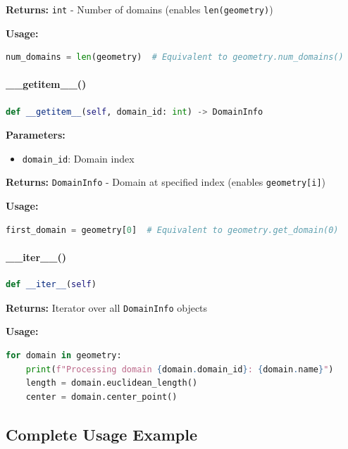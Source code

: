 \textbf{Returns:} \texttt{int} - Number of domains (enables \texttt{len(geometry)})

\textbf{Usage:}
\begin{lstlisting}[language=Python]
num_domains = len(geometry)  # Equivalent to geometry.num_domains()
\end{lstlisting}

\paragraph{\_\_getitem\_\_()}\leavevmode
\begin{lstlisting}[language=Python, caption=Indexing Support]
def __getitem__(self, domain_id: int) -> DomainInfo
\end{lstlisting}

\textbf{Parameters:}
\begin{itemize}
    \item \texttt{domain\_id}: Domain index
\end{itemize}

\textbf{Returns:} \texttt{DomainInfo} - Domain at specified index (enables \texttt{geometry[i]})

\textbf{Usage:}
\begin{lstlisting}[language=Python]
first_domain = geometry[0]  # Equivalent to geometry.get_domain(0)
\end{lstlisting}

\paragraph{\_\_iter\_\_()}\leavevmode
\begin{lstlisting}[language=Python, caption=Iteration Support]
def __iter__(self)
\end{lstlisting}

\textbf{Returns:} Iterator over all \texttt{DomainInfo} objects

\textbf{Usage:}
\begin{lstlisting}[language=Python]
for domain in geometry:
    print(f"Processing domain {domain.domain_id}: {domain.name}")
    length = domain.euclidean_length()
    center = domain.center_point()
\end{lstlisting}

\subsection{Complete Usage Example}
\label{subsec:complete_example}

